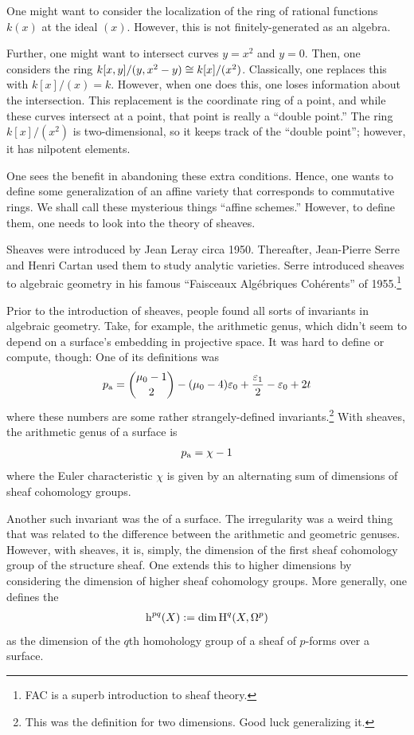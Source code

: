 \documentclass [11 pt, oneside, margin = 1 in] {article}
\begin{document}
One might want to consider the localization of the ring of rational functions $k(x)$ at the ideal $(x)$. However, this is not finitely-generated as an algebra.

Further, one might want to intersect curves $y=x^2$ and $y=0$. Then, one considers the ring $k[x,y]/(y,x^2-y) \isomto k[x]/ (x^2)$. Classically, one replaces this with $k[x]/(x) = k$. However, when one does this, one loses information about the intersection. This replacement is the coordinate ring of a point, and while these curves intersect at a point, that point is really a ``double point.'' The ring $k[x]/(x^2)$ is two-dimensional, so it keeps track of the ``double point''; however, it has nilpotent elements.

One sees the benefit in abandoning these extra conditions. Hence, one wants to define some generalization of an affine variety that corresponds to commutative rings. We shall call these mysterious things ``affine schemes.'' However, to define them, one needs to look into the theory of sheaves.

Sheaves were introduced by Jean Leray circa 1950. Thereafter, Jean-Pierre Serre and Henri Cartan used them to study analytic varieties. Serre introduced sheaves to algebraic geometry in his famous ``Faisceaux Algébriques Cohérents'' of 1955.\footnote{FAC is a superb introduction to sheaf theory.}

Prior to the introduction of sheaves, people found all sorts of invariants in algebraic geometry. Take, for example, the arithmetic genus, which didn't seem to depend on a surface's embedding in projective space. It was hard to define or compute, though: One of its definitions was
\begin{align*}
	p\textsubscript{a} = \binom{\mu_0-1}{2} - (\mu_0 - 4) \epsilon_0 + \frac{\epsilon_1}{2} - \epsilon_0+2t
\end{align*}
where these numbers are some rather strangely-defined invariants.\footnote{This was the definition for two dimensions. Good luck generalizing it.} With sheaves, the arithmetic genus of a surface is
\begin{align*}
	p\textsubscript{a} = \chi -1
\end{align*}
where the Euler characteristic $\chi$ is given by an alternating sum of dimensions of sheaf cohomology groups.

Another such invariant was the  of a surface. The irregularity was a weird thing that was related to the difference between the arithmetic and geometric genuses. However, with sheaves, it is, simply, the dimension of the first sheaf cohomology group of the structure sheaf. One extends this to higher dimensions by considering the dimension of higher sheaf cohomology groups. More generally, one defines the  
\begin{align*}
	{\h}^{pq}(X) := \dim \HH^q(X,\Omega^p) 
\end{align*}
as the dimension of the $q$th homohology group of a sheaf of $p$-forms over a surface.
\end{document}
